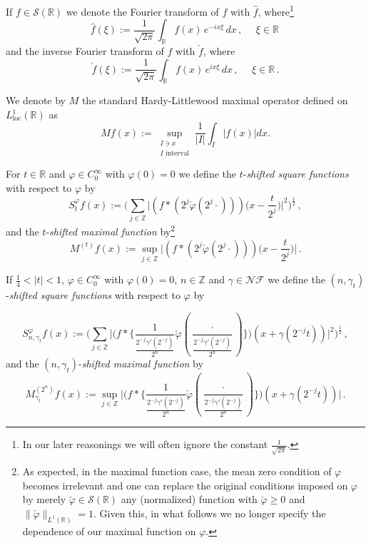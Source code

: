 \documentclass{amsart}
\newcommand{\R}{\mathbb{R}}
\newcommand{\Z}{\mathbb{Z}}
\newcommand{\s}{\mathcal{S}}
\def\v{\varphi}
\newcommand{\g}{\gamma}
\newcommand{\NF}{\mathcal{NF}}
\theoremstyle{definition}
\theoremstyle{remark}
\numberwithin{equation}{section}
\begin{document}
If $f\in \s(\R)$ we denote the Fourier transform of $f$ with $\hat{f}$, where\footnote{In our later reasonings we will often ignore the constant $\frac{1}{\sqrt{2\pi}}$.}
$$\hat{f}(\xi):=\frac{1}{\sqrt{2\pi}}\int_{\R} f(x)\,e^{-i x \xi}\,d x\,,\:\:\:\:\:\:\xi\in\R\,$$
and the inverse Fourier transform of $f$ with $\check{f}$, where
$$\check{f}(\xi):=\frac{1}{\sqrt{2\pi}}\int_{\R} f(x)\,e^{i x \xi}\,d x\,,\:\:\:\:\:\:\xi\in\R\,.$$

We denote by $M$ the standard Hardy-Littlewood maximal operator defined on $L^1_\text{loc}(\R)$ as
\[Mf(x):=\sup\limits_{\substack{I\ni x\\ I\text{ interval}}}\frac{1}{|I|}\int_I |f(x)|dx.\]

For $t\in\R$ and $\v\in C^\infty_0$ with $\v(0)=0$ we define the $t$-\emph{shifted square functions} with respect to $\v$ by
\begin{equation}\label{shif_max}
S_t^{\v}f(x):=\Big(\sum\limits_{j\in\Z}\Big|(f* (2^j\check{\v}(2^j\cdot)))\big(x-\frac{t}{2^j} \big)\Big|^2\Big)^\frac{1}{2}\,,
\end{equation}
and the $t$-\emph{shifted maximal function} by\footnote{As expected, in the maximal function case, the mean zero condition of $\v$ becomes irrelevant and one can replace the original conditions imposed on $\v$ by merely $\check{\v}\in \s(\R)$ any (normalized) function with $\check{\v}\geq 0$ and $\|\check{\v}\|_{L^1(\R)}=1$. Given this, in what follows we no longer specify the dependence of our maximal function on $\v$.}
\begin{equation}\label{shif_maxM}
M^{(t)}f(x):=\sup\limits_{j\in\Z}\Big|(f* (2^j\check{\v}(2^j\cdot)))\big(x-\frac{t}{2^j} \big)\Big|\,.
\end{equation}

If $\frac{1}{4} <|t|<1$, $\v\in C^\infty_0$ with $\v(0)=0$, $n\in\Z $ and $\g\in\NF$ we define the $(n,\g_t)$-\emph{shifted square functions} with respect to $\v$ by

\begin{equation}\label{shif_maxgama}
S_{n,\g_t}^{\v}f(x):=\Big(\sum\limits_{j\in\Z}\Big|\Big(f*\big\{\frac{1}{\tfrac{2^{-j}\gamma'(2^{-j})}{2^n}} \check{\v} (\frac{\cdot}{\tfrac{2^{-j}\gamma'(2^{-j})}{2^n}})\big\}\Big) (x+\gamma(2^{-j}t))\Big|^2\Big)^\frac{1}{2}\,,
\end{equation}
and the $(n,\g_t)$-\emph{shifted maximal function} by
\begin{equation}\label{shif_maxgamaM}
M^{(2^n)}_{\g_t}f(x):=\sup\limits_{j\in\Z}\Big|\Big(f*\big\{\frac{1}{\tfrac{2^{-j}\gamma'(2^{-j})}{2^n}} \check{\v} (\frac{\cdot}{\tfrac{2^{-j}\gamma'(2^{-j})}{2^n}})\big\}\Big) (x+\gamma(2^{-j}t))\Big|\,.
\end{equation}
\end{document}
